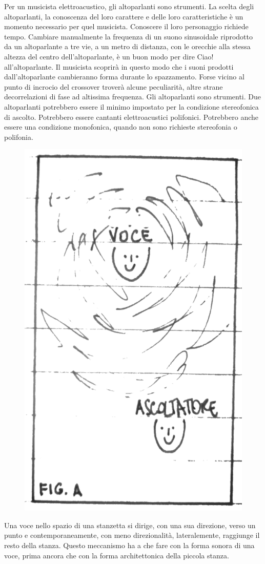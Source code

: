 Per un musicista elettroacustico, gli altoparlanti sono strumenti. La scelta
degli altoparlanti, la conoscenza del loro carattere e delle loro
caratteristiche è un momento necessario per quel musicista. Conoscere il loro
personaggio richiede tempo. Cambiare manualmente la frequenza di un suono
sinusoidale riprodotto da un altoparlante a tre vie, a un metro di distanza,
con le orecchie alla stessa altezza del centro dell'altoparlante, è un buon modo
per dire Ciao! all'altoparlante. Il musicista scoprirà in questo modo che i
suoni prodotti dall'altoparlante cambieranno forma durante lo spazzamento. Forse
vicino al punto di incrocio del crossover troverà alcune peculiarità, altre
strane decorrelazioni di fase ad altissima frequenza. Gli altoparlanti sono
strumenti. Due altoparlanti potrebbero essere il minimo impostato per la
condizione stereofonica di ascolto. Potrebbero essere cantanti elettroacustici
polifonici. Potrebbero anche essere una condizione monofonica, quando non sono
richieste stereofonia o polifonia.%

\begin{figure}[h]
\begin{center}
  \includegraphics[width=.48\linewidth]{CAPITOLI/1000/IMG/figa.png}
\label{ee:figa}
\end{center}
\end{figure}

Una voce nello spazio di una stanzetta si dirige, con una sua direzione, verso
un punto e contemporaneamente, con meno direzionalità, lateralemente, raggiunge
il resto della stanza. Questo meccanismo ha a che fare con la forma sonora di una
voce, prima ancora che con la forma architettonica della piccola stanza.

